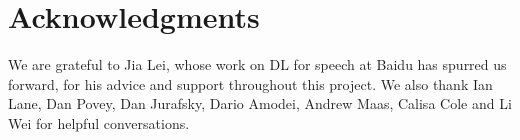 \documentclass{article}
\begin{document}
\section*{Acknowledgments} 
We are grateful to Jia Lei, whose work on DL for speech at Baidu has spurred us
forward, for his advice and support throughout this project.  We also thank Ian
Lane, Dan Povey, Dan Jurafsky, Dario Amodei, Andrew Maas, Calisa Cole and Li
Wei for helpful conversations.



\end{document}
